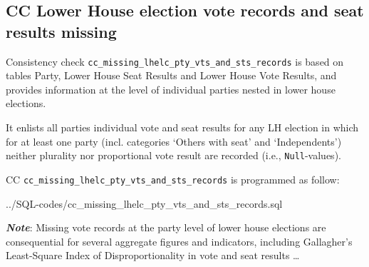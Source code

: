 \subsection{CC Lower House election vote records and seat results missing}\label{cc_missing_lhelc_pty_vts_and_sts_records}
Consistency check \texttt{\footnotesize cc\_missing\_lhelc\_pty\_vts\_and\_sts\_records} is based on tables Party, Lower House Seat Results and Lower House Vote Results, and provides information at the level of individual parties nested in lower house elections. 

It enlists all parties individual vote and seat results for any LH election in which for at least one party (incl. categories `Others with seat' and `Independents') neither plurality nor proportional vote result are recorded (i.e., \texttt{\footnotesize Null}-values).


CC \texttt{\footnotesize cc\_missing\_lhelc\_pty\_vts\_and\_sts\_records} is programmed as follow: 

%
{../SQL-codes/cc_missing_lhelc_pty_vts_and_sts_records.sql}

{\em \bf Note}: Missing vote records at the party level of lower house elections are consequential for several aggregate figures and indicators, including Gallagher's Least-Square Index of Disproportionality in vote and seat results \ldots
